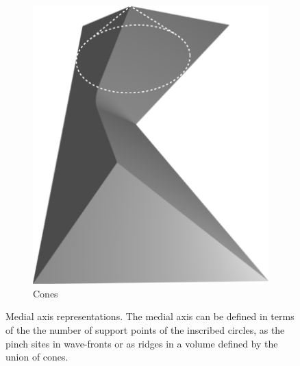 \begin{figure}
\begin{subfigure}{0.3\columnwidth}
\includegraphics[height=1.5\columnwidth]{sources/method/MAT_explanation_cones.pdf}
\caption{Cones}
\end{subfigure}
\caption{
Medial axis representations.
The medial axis can be defined in terms of the the number of support points of the inscribed circles,
as the pinch sites in wave-fronts
or as ridges in a volume defined by the union of cones.
}
\label{MAT_explanation}
\end{figure}


